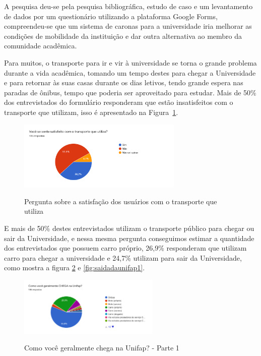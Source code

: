 A pesquisa deu-se pela pesquisa bibliográfica, estudo de caso e um levantamento de dados por um questionário utilizando a plataforma Google Forms, compreendeu-se que um sistema de caronas para a universidade iria melhorar as condições de mobilidade da instituição e dar outra alternativa ao membro da comunidade acadêmica.

Para muitos, o transporte para ir e vir à universidade se torna o grande problema durante a vida acadêmica, tomando um tempo destes para chegar a Universidade e para retornar às suas casas durante os dias letivos, tendo grande espera nas paradas de ônibus, tempo que poderia ser aproveitado para estudar. Mais de 50\% dos entrevistados do formulário responderam que estão insatisfeitos com o transporte que utilizam, isso é apresentado na Figura~\ref{fig:satisfacao}.

\begin{figure}[!hbtp]
	\centering
	\caption{Pergunta sobre a satisfação dos usuários com o transporte que utiliza}
	\includegraphics[width=0.7\textwidth]{./04-figuras/questionario/6.png}
	\label{fig:satisfacao}
\end{figure}

E mais de 50\% destes entrevistados utilizam o transporte público para chegar ou sair da Universidade, e nessa mesma pergunta conseguimos estimar a quantidade dos entrevistados que possuem carro próprio, 26,9\% responderam que utilizam carro para chegar a universidade e 24,7\% utilizam para sair da Universidade, como mostra a figura \ref{fig:chegadanaunifap1} e \ref{fig:saidadaunifap1}.

\begin{figure}[!hbtp]
	\centering
	\caption{Como você geralmente chega na Unifap? -  Parte 1}
	\includegraphics[width=0.6\textwidth]{./04-figuras/questionario/7.png}
	\label{fig:chegadanaunifap1}
\end{figure}

